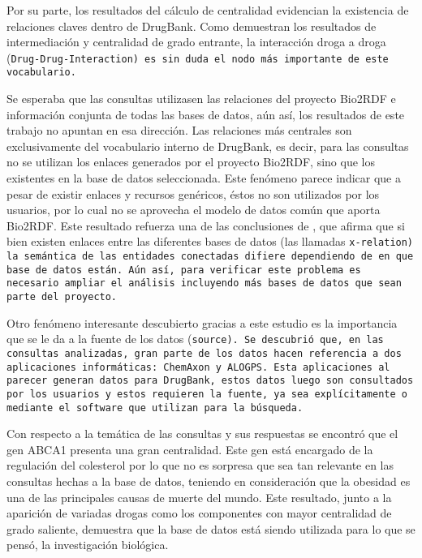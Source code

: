 Por su parte, los resultados del cálculo de centralidad evidencian la existencia
de relaciones claves dentro de DrugBank.
Como demuestran los resultados de intermediación y centralidad de grado
entrante, la interacción droga a droga (\tt{Drug-Drug-Interaction}) es sin duda
el nodo más importante de este vocabulario.

Se esperaba que las consultas utilizasen las relaciones del proyecto Bio2RDF e
información conjunta de todas las bases de datos, aún así, los resultados de
este trabajo no apuntan en esa dirección.
Las relaciones más centrales son exclusivamente del vocabulario interno de
DrugBank, es decir, para las consultas no se utilizan los enlaces generados por
el proyecto Bio2RDF, sino que los existentes en la base de datos seleccionada.
Este fenómeno parece indicar que a pesar de existir enlaces y recursos
genéricos, éstos no son utilizados por los usuarios, por lo cual no se
aprovecha el modelo de datos común que aporta Bio2RDF.
Este resultado refuerza una de las conclusiones de \cite{hu2015link}, que afirma
que si bien existen enlaces entre las diferentes bases de datos (las llamadas
\tt{x-relation}) la semántica de las entidades conectadas difiere dependiendo de
en que base de datos están.
Aún así, para verificar este problema es necesario ampliar el análisis
incluyendo más bases de datos que sean parte del proyecto.

Otro fenómeno interesante descubierto  gracias a este estudio es la importancia
que se le da a la fuente de los datos (\tt{source}).
Se descubrió que, en las consultas analizadas, gran parte de los datos hacen
referencia a dos aplicaciones informáticas: ChemAxon y ALOGPS.
Esta aplicaciones al parecer generan datos para DrugBank, estos datos luego son
consultados por los usuarios y estos requieren la fuente, ya sea explícitamente
o mediante el software que utilizan para la búsqueda.

Con respecto a la temática de las consultas y sus respuestas se encontró que el
gen ABCA1 presenta una gran centralidad. Este gen está encargado de la
regulación del colesterol por lo que no es sorpresa que sea tan relevante en las
consultas hechas a la base de datos, teniendo en consideración que la obesidad
es una de las principales causas de muerte del mundo. Este resultado, junto a la
aparición de variadas drogas como los componentes con mayor centralidad de grado
saliente, demuestra que la base de datos está siendo utilizada para lo que se
pensó, la investigación biológica.

